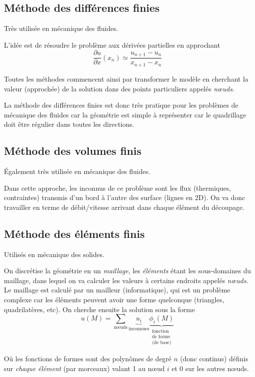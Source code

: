 \documentclass{article}
\begin{document}
\subsection{Méthode des différences finies}
Très utilisée en mécanique des fluides.

L'idée est de résoudre le problème aux dérivées partielles en approchant 
\[\dfrac{\partial u}{\partial x} (x_n) \simeq \dfrac{u_{n+1} - u_n}{x_{n+1}-x_n}
\]

Toutes les méthodes commencent ainsi par transformer le modèle en cherchant la valeur (approchée) de la solution dans des points particuliers appelés \emph{nœuds}. 
\bigskip

La méthode des différences finies est donc très pratique pour les problèmes de mécanique des fluides car la géométrie est simple à représenter car le quadrillage doit être régulier dans toutes les directions.

\subsection{Méthode des volumes finis}
Également très utilisée en mécanique des fluides.

Dans cette approche, les inconnus de ce problème sont les flux (thermiques, contraintes) transmis d'un bord à l'autre des surface (lignes en 2D). On va donc travailler en terme de débit/vitesse arrivant dans chaque élément du découpage.


\subsection{Méthode des éléments finis}
Utilisés en mécanique des solides.

On discrétise la géométrie en un \emph{maillage}, les \emph{éléments} étant les sous-domaines du maillage, dans lequel on va calculer les valeurs à certains endroits appelés \emph{nœuds}. Le maillage est calculé par un mailleur (informatique), qui est un problème complexe car les éléments peuvent avoir une forme quelconque (triangles, quadrilatères, etc). On cherche ensuite la solution sous la forme
\[u(M) = \sum_{\text{nœuds}} \underbrace{u_i}_{\text{inconnues}} \underbrace{\phi_i (M)}_{\substack{\text{fonction}\\\text{de forme}\\\text{(de base)}}}\]

Où les fonctions de formes sont des polynômes de degré $n$ (donc continus) définis sur \emph{chaque élément} (par morceaux) valant 1 au nœud $i$ et 0 sur les autres nœuds.
\end{document}
